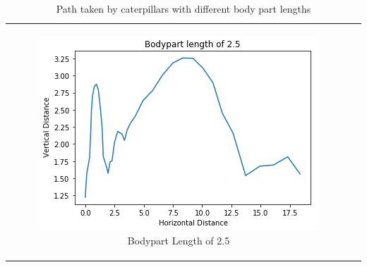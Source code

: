 \documentclass[12pt,oneside,listof=totoc,paper=a4,headings=small]{scrbook}
\begin{document}
{\begin{table}[h!]
\begin{tabular}{cc}
\begin{subfigure}{0.4\textwidth}\centering\includegraphics[width=0.75\columnwidth]{images/length_25.png}\caption{Bodypart Length of 2.5}\label{fig:lengthtabj}\end{subfigure}\\
\end{tabular}
\caption{Path taken by caterpillars with different body part lengths}
\label{tab:pathplotlength}
\end{table}
}

\newpage
\end{document}
